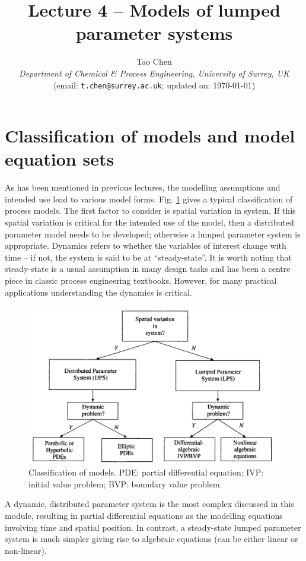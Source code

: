 \documentclass[a4paper,11pt]{article}
\title{\vspace{-2cm} Lecture 4 -- Models of lumped parameter systems}
\author{Tao Chen\\
{\small \emph{Department of Chemical \& Process Engineering, University of Surrey, UK}}\\
{\small (email: \texttt{t.chen@surrey.ac.uk}; \hspace{0.5cm} updated on: \today )}
}
\date{}
\theoremstyle{definition}
\begin{document}
\maketitle

\vspace{-0.5cm}

\section{Classification of models and model equation sets}

As has been mentioned in previous lectures, the modelling assumptions and intended use
lead to various model forms. Fig. \ref{fig:model_class} gives a typical classification of process models.
The first factor to consider is spatial variation in system.
If this spatial variation is critical for the intended use of the model, then a distributed parameter model
needs to be developed; otherwise a lumped parameter system is appropriate.
Dynamics refers to whether the variables of interest change with time -- if not, the system is said to be at
``steady-state''. It is worth noting that steady-state is a usual assumption in many design tasks and has
been a centre piece in classic process engineering textbooks. However, for many practical applications
understanding the dynamics is critical.

\begin{figure}[!h]
 \begin{center}
	\includegraphics[width=.6\textwidth]{model_class}
 \end{center}
 \caption{Classification of models. PDE: partial differential equation; IVP: initial value problem; BVP: boundary value problem.} 
 \label{fig:model_class}
\end{figure}

A dynamic, distributed parameter system is the most complex discussed in this module, resulting in
partial differential equations as the modelling equations involving time and spatial position.
In contrast, a steady-state lumped parameter system is much simpler giving rise to algebraic equations (can be either linear or non-linear).
\end{document}
